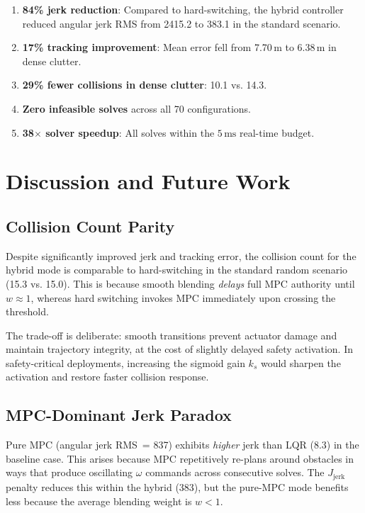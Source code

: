 \documentclass[12pt,a4paper,oneside]{report}
\begin{document}
\begin{enumerate}
  \item \textbf{84\% jerk reduction}: Compared to hard-switching, the
    hybrid controller reduced angular jerk RMS from 2415.2 to 383.1
    in the standard scenario.
  \item \textbf{17\% tracking improvement}: Mean error fell from 7.70\,m
    to 6.38\,m in dense clutter.
  \item \textbf{29\% fewer collisions in dense clutter}: 10.1 vs. 14.3.
  \item \textbf{Zero infeasible solves} across all 70 configurations.
  \item \textbf{38$\times$ solver speedup}: All solves within the
    $5\,\text{ms}$ real-time budget.
\end{enumerate}

\chapter{Discussion and Future Work}\label{ch:discussion}

\section{Collision Count Parity}

Despite significantly improved jerk and tracking error, the collision count
for the hybrid mode is comparable to hard-switching in the standard random
scenario (15.3 vs. 15.0). This is because smooth blending \textit{delays}
full MPC authority until \(w \approx 1\), whereas hard switching invokes
MPC immediately upon crossing the threshold.

The trade-off is deliberate: smooth transitions prevent actuator damage
and maintain trajectory integrity, at the cost of slightly delayed safety
activation. In safety-critical deployments, increasing the sigmoid gain
\(k_s\) would sharpen the activation and restore faster collision response.

\section{MPC-Dominant Jerk Paradox}

Pure MPC (angular jerk RMS~= 837) exhibits \textit{higher} jerk than LQR
(8.3) in the baseline case. This arises because MPC repetitively re-plans
around obstacles in ways that produce oscillating \(\omega\) commands across
consecutive solves. The \(J_{\mathrm{jerk}}\) penalty reduces this within
the hybrid (383), but the pure-MPC mode benefits less because the average
blending weight is \(w<1\).
\end{document}
